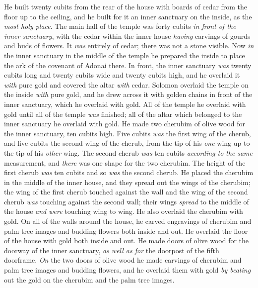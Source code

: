 \begin{biblechapter}
\verse He built twenty cubits from the rear of the house with boards of cedar from the floor up to the ceiling, and he built for it an inner sanctuary on the inside, as the \textit{most holy place}.
\verse The main hall of the temple was forty cubits \textit{in front of the inner sanctuary},
\verse with the cedar within the inner house \textit{having} carvings of gourds and buds of flowers. It \textit{was} entirely of cedar; there was not a stone visible.
\verse Now \textit{in} the inner sanctuary in the middle of the temple he prepared the inside to place the ark of the covenant of Adonai there.
\verse In front, the inner sanctuary \textit{was} twenty cubits long and twenty cubits wide and twenty cubits high, and he overlaid it \textit{with} pure gold and covered the altar \textit{with} cedar.
\verse Solomon overlaid the temple on the inside \textit{with} pure gold, and he drew across it with golden chains in front of the inner sanctuary, which he overlaid with gold.
\verse All of the temple he overlaid with gold until all of the temple \textit{was} finished; all of the altar which belonged to the inner sanctuary he overlaid with gold.
\verse He made two cherubim of olive wood for the inner sanctuary, ten cubits high.
\verse Five cubits \textit{was} the first wing of the cherub, and five cubits the second wing of the cherub, from the tip of his \textit{one} wing up to the tip of his \textit{other} wing.
\verse The second cherub \textit{was} ten cubits \textit{according to} \textit{the same} measurement, and \textit{there} was one shape for the two cherubim.
\verse The height of the first cherub \textit{was} ten cubits and so \textit{was} the second cherub.
\verse He placed the cherubim in the middle of the inner house, and they spread out the wings of the cherubim; the wing of the first cherub touched against the wall and the wing of the second cherub \textit{was} touching against the second wall; their wings \textit{spread} to the middle of the house \textit{and were} touching wing to wing.
\verse He also overlaid the cherubim with gold.
\verse On all of the walls around the house, he carved engravings of cherubim and palm tree images and budding flowers both inside and out.
\verse He overlaid the floor of the house with gold both inside and out.
\verse He made doors of olive wood for the doorway of the inner sanctuary, \textit{as well as for} the doorpost of the fifth doorframe.
\verse \textit{On} the two doors of olive wood he made carvings of cherubim and palm tree images and budding flowers, and he overlaid them with gold \textit{by beating} out the gold on the cherubim and the palm tree images.

\end{biblechapter}
